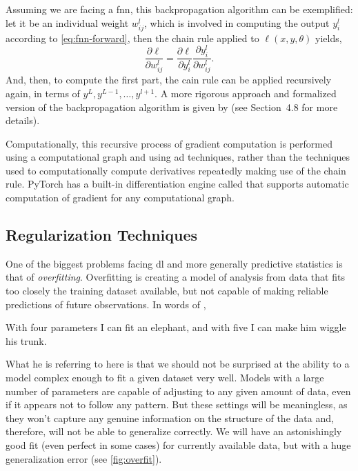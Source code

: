 Assuming we are facing a \gls{fnn}, this backpropagation algorithm can be
exemplified: let it be an individual weight \(w_ {ij} ^ l\), which is involved
in computing the output \(y_i^l\) according to \vref{eq:fnn-forward}, then the
chain rule applied to \(\ell (x, y, \theta)\) yields,
\begin{equation}
  \frac{\partial \ell}{\partial w_{ij}^l} =
  \frac{\partial \ell}{\partial y_i^l}
  \frac{\partial y_i^l}{\partial w_{ij}^l}.
\end{equation}
And, then, to compute the first part, the cain rule can be applied recursively
again, in terms of \(y^L, y^{L - 1}, \ldots, y^{l + 1}\). A more rigorous
approach and formalized version of the backpropagation algorithm is given by
 (see Section~4.8 for more
details).

Computationally, this recursive process of gradient computation is performed
using a computational graph and using \gls{ad} techniques, rather than the
techniques used to computationally compute derivatives repeatedly making use of
the chain rule. PyTorch has a built-in differentiation engine called
 that supports automatic computation of gradient for any
computational graph.

\subsection{Regularization Techniques}

One of the biggest problems facing \gls{dl} and more generally predictive
statistics is that of \emph{overfitting}. Overfitting is
creating a model of analysis from data that fits too closely the training
dataset available, but not capable of making reliable predictions of future
observations. In words of ,
\begin{quoteBox}
  With four parameters I can fit an elephant, and with five I can make him
  wiggle his trunk.
  \tcblower{}
\end{quoteBox}

What he is referring to here is that we should not be surprised at the ability
to a model complex enough to fit a given dataset very well. Models with a large
number of parameters are capable of adjusting to any given amount of data, even
if it appears not to follow any pattern. But these settings will be
meaningless, as they won't capture any genuine information on the structure of
the data and, therefore, will not be able to generalize correctly. We will have
an astonishingly good fit (even perfect in some cases) for currently available
data, but with a huge generalization error (see \vref{fig:overfit}).

